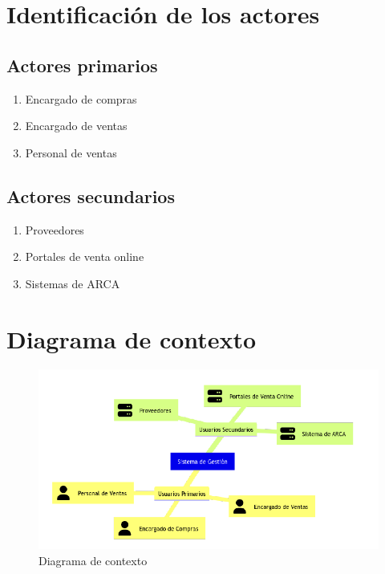 
\section{Identificación de los actores}

\subsection*{Actores primarios}
\begin{enumerate}
	\item Encargado de compras
	\item Encargado de ventas
	\item Personal de ventas
\end{enumerate}

\subsection*{Actores secundarios}
\begin{enumerate}
	\item Proveedores 
	\item Portales de venta online 
	\item Sistemas de ARCA
\end{enumerate}

\section{Diagrama de contexto}

\begin{figure}[H]
	\vspace{20pt}
	\centering
	\vspace{15pt}
	\includegraphics[width=.9\textwidth]{img/00-diagrama-contexto}
	\caption{Diagrama de contexto}
	\vspace{15pt}
\end{figure}